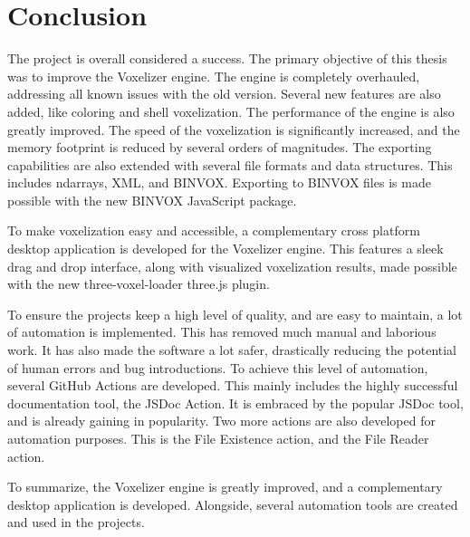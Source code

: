 \chapter{Conclusion}
The project is overall considered a success. The primary objective of this thesis was to improve the Voxelizer engine. The engine is completely overhauled, addressing all known issues with the old version. Several new features are also added, like coloring and shell voxelization. The performance of the engine is also greatly improved. The speed of the voxelization is significantly increased, and the memory footprint is reduced by several orders of magnitudes. The exporting capabilities are also extended with several file formats and data structures. This includes ndarrays, XML, and BINVOX. Exporting to BINVOX files is made possible with the new BINVOX JavaScript package.

To make voxelization easy and accessible, a complementary cross platform desktop application is developed for the Voxelizer engine. This features a sleek drag and drop interface, along with visualized voxelization results, made possible with the new three-voxel-loader three.js plugin.

To ensure the projects keep a high level of quality, and are easy to maintain, a lot of automation is implemented. This has removed much manual and laborious work. It has also made the software a lot safer, drastically reducing the potential of human errors and bug introductions. To achieve this level of automation, several GitHub Actions are developed. This mainly includes the highly successful documentation tool, the JSDoc Action. It is embraced by the popular JSDoc tool, and is already gaining in popularity. Two more actions are also developed for automation purposes. This is the File Existence action, and the File Reader action.   

To summarize, the Voxelizer engine is greatly improved, and a complementary desktop application is developed. Alongside, several automation tools are created and used in the projects.